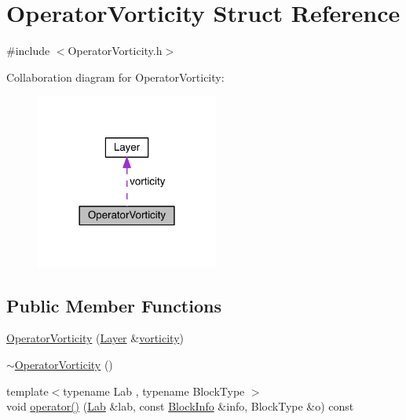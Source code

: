 \hypertarget{struct_operator_vorticity}{}\section{Operator\+Vorticity Struct Reference}
\label{struct_operator_vorticity}


{\ttfamily \#include $<$Operator\+Vorticity.\+h$>$}



Collaboration diagram for Operator\+Vorticity\+:\nopagebreak
\begin{figure}[H]
\begin{center}
\leavevmode
\includegraphics[width=170pt]{da/de1/struct_operator_vorticity__coll__graph}
\end{center}
\end{figure}
\subsection*{Public Member Functions}
\begin{DoxyCompactItemize}
\item 
\hyperlink{struct_operator_vorticity_a5f119e3cd343868bce48c0c46865854c}{Operator\+Vorticity} (\hyperlink{struct_layer}{Layer} \&\hyperlink{struct_operator_vorticity_a8612e8747d5eb6a0ab2f8064e9ba1ba7}{vorticity})
\item 
\hyperlink{struct_operator_vorticity_af42ecc8472869fd7ae95d1506f29f39d}{$\sim$\+Operator\+Vorticity} ()
\item 
{\footnotesize template$<$typename Lab , typename Block\+Type $>$ }\\void \hyperlink{struct_operator_vorticity_a3e677de987ab03e9a31a6978fd46b512}{operator()} (\hyperlink{_definitions_8h_ad6f951af9a2a6ebc1975404882b34314}{Lab} \&lab, const \hyperlink{struct_block_info}{Block\+Info} \&info, Block\+Type \&o) const 
\end{DoxyCompactItemize}
